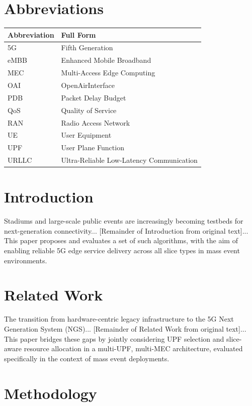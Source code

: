 \documentclass[conference]{IEEEtran}
\begin{document}
\section*{Abbreviations}
\begin{center}
\begin{tabular}{ll}
\hline
\textbf{Abbreviation} & \textbf{Full Form} \\
\hline
5G   & Fifth Generation \\
eMBB & Enhanced Mobile Broadband \\
MEC  & Multi-Access Edge Computing \\
OAI  & OpenAirInterface \\
PDB  & Packet Delay Budget \\
QoS  & Quality of Service \\
RAN  & Radio Access Network \\
UE   & User Equipment \\
UPF  & User Plane Function \\
URLLC & Ultra-Reliable Low-Latency Communication \\
\hline
\end{tabular}
\end{center}


\section{Introduction}
Stadiums and large-scale public events are increasingly becoming testbeds for next-generation connectivity... [Remainder of Introduction from original text]... This paper proposes and evaluates a set of such algorithms, with the aim of enabling reliable 5G edge service delivery across all slice types in mass event environments.

\section{Related Work}
The transition from hardware-centric legacy infrastructure to the 5G Next Generation System (NGS)... [Remainder of Related Work from original text]... This paper bridges these gaps by jointly considering UPF selection and slice-aware resource allocation in a multi-UPF, multi-MEC architecture, evaluated specifically in the context of mass event deployments.

\section{Methodology}
\label{sec:methodology}
\end{document}
